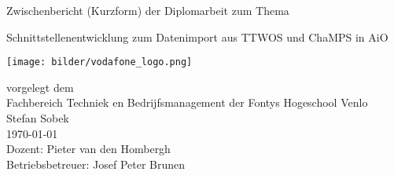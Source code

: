 

\begin{titlepage}
\vspace{4em}
\center
 \Large{\textsf{Zwischenbericht (Kurzform) der Diplomarbeit zum Thema}}
 \vspace{1em}

\Huge{\textsf{Schnittstellenentwicklung zum Datenimport aus TTWOS und ChaMPS in AiO}}
\vspace{1em}
\\
\begin{center}
	\texttt{[image: bilder/vodafone\_logo.png]}
\end{center}
\vspace{1em}
\Large{
\textsf{
vorgelegt dem\\
Fachbereich Techniek en Bedrijfsmanagement der Fontys Hogeschool Venlo
}
}
\vspace{2em}
\\
\Large{
\textsf{
Stefan Sobek\\
\today
\vspace{2em}
\\
Dozent: Pieter van den Hombergh\\
Betriebsbetreuer: Josef Peter Brunen
}
}
\end{titlepage}